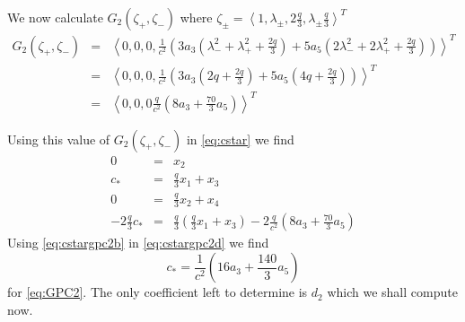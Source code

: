 We now calculate $G_2(\zeta_+, \zeta_-)$ where $ \zeta_\pm = \left<1, \lambda_\pm, 2 \frac{q}{3}, \lambda_\pm \frac{q}{3} \right>^T $
\begin{subequations}
\begin{eqnarray*}
G_2\left(\zeta_+, \zeta_-\right) &=& \left<0,0,0, \frac{1}{c^2}\left( 3 a_3\left( \lambda_-^2 + \lambda_+^2 + \frac{2q}{3} \right) + 
5 a_5 \left( 2 \lambda_-^2 + 2 \lambda_+^2 + \frac{2q}{3} \right) \right) \right>^T \\
&=& \left<0,0,0, \frac{1}{c^2}\left( 3 a_3 \left( 2 q + \frac{2q}{3} \right) + 5 a_5 \left( 4 q + \frac{2q}{3} \right) \right) \right>^T \\
&=& \left<0,0,0 \frac{q}{c^2} \left( 8 a_3 + \frac{70}{3} a_5 \right) \right>^T
\end{eqnarray*}
\end{subequations}


Using this value of $G_2(\zeta_+, \zeta_-)$ in \eqref{eq:cstar} we find
\begin{subequations}
\begin{eqnarray}
0 &=& x_2 \\
c_* &=& \frac{q}{3} x_1 + x_3 \label{eq:cstargpc2b}\\
0 &=& \frac{q}{3} x_2 + x_4 \\
-2 \frac{q}{3} c_* &=& \frac{q}{3}\left( \frac{q}{3} x_1 + x_3 \right) - 2 \frac{q}{c^2}\left( 8 a_3 + \frac{70}{3} a_5 \right) \label{eq:cstargpc2d}
\end{eqnarray}
\end{subequations}
Using \eqref{eq:cstargpc2b} in \eqref{eq:cstargpc2d}  we find
\begin{equation}
c_* = \frac{1}{c^2}\left( 16 a_3 + \frac{140}{3} a_5 \right)
\end{equation}
for \eqref{eq:GPC2}.  The only coefficient left to determine is $d_2$ which we shall compute now. 

